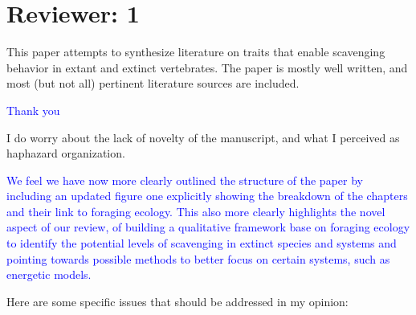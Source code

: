 \documentclass[12pt,letterpaper]{article}
\begin{document}
\section{Reviewer: 1}
This paper attempts to synthesize literature on traits that enable scavenging behavior in extant and extinct vertebrates.
The paper is mostly well written, and most (but not all) pertinent literature sources are included.

\textcolor{blue}{Thank you}

I do worry about the lack of novelty of the manuscript, and what I perceived as haphazard organization. 

\textcolor{blue}{We feel we have now more clearly outlined the structure of the paper by including an updated figure one explicitly showing the breakdown of the chapters and their link to foraging ecology. This also more clearly highlights the novel aspect of our review, of building a qualitative framework base on foraging ecology to identify the potential levels of scavenging in extinct species and systems and pointing towards possible methods to better focus on certain systems, such as energetic models.}

Here are some specific issues that should be addressed in my opinion:
\end{document}

